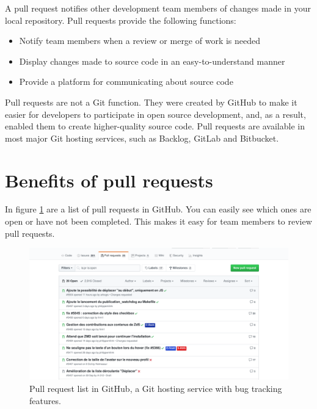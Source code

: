 \documentclass[10pt,a4paper,english]{report}
\begin{document}
    A pull request notifies other development team members of changes made in your local repository. Pull requests provide the following functions:
    \begin{itemize}
        \item Notify team members when a review or merge of work is needed
        \item Display changes made to source code in an easy-to-understand manner
        \item Provide a platform for communicating about source code
    \end{itemize}

    Pull requests are not a Git function. They were created by GitHub to make it easier for developers to participate in open source development, and, as a result, enabled them to create higher-quality source code. Pull requests are available in most major Git hosting services, such as Backlog, GitLab and Bitbucket.

    \section{Benefits of pull requests}

    In figure \ref{fig:pr-list} are a list of pull requests in GitHub. You can easily see which ones are open or have not been completed. This makes it easy for team members to review pull requests.

    \begin{figure}[ht]
    \begin{center}
    \includegraphics[scale=0.35]{images/pull_requests_002.png}
    \end{center}
    \caption{Pull request list in GitHub, a Git hosting service with bug tracking features.}
    \label{fig:pr-list}
    \end{figure}
\end{document}
